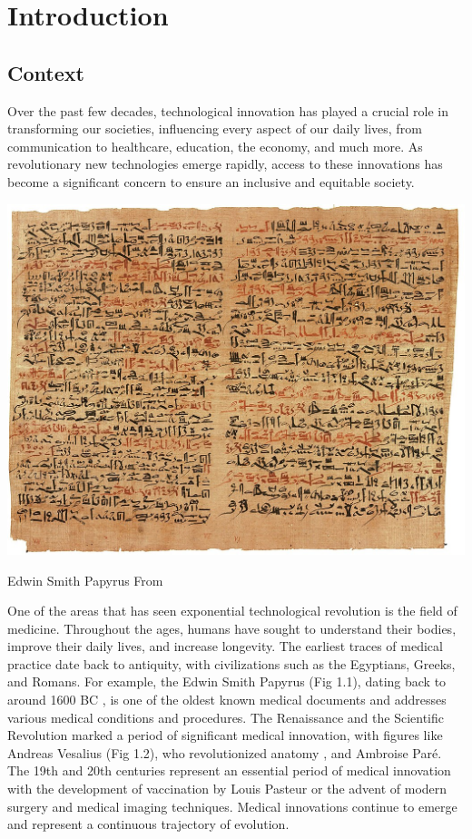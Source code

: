 \chapter{Introduction}
\section{Context}
Over the past few decades, technological innovation has played a crucial role in transforming our societies, influencing every aspect of our daily lives, from communication to healthcare, education, the economy, and much more. As revolutionary new technologies emerge rapidly, access to these innovations has become a significant concern to ensure an inclusive and equitable society.

\begin{marginfigure}[-5.5cm]
	\includegraphics{YOURNAME/images/Edwin_Smith_Papyrus_v2.jpg}
	\caption[]{Edwin Smith Papyrus From \cite{van_middendorp_edwin_2010}}
	\labfig{}
\end{marginfigure} 

One of the areas that has seen exponential technological revolution is the field of medicine. Throughout the ages, humans have sought to understand their bodies, improve their daily lives, and increase longevity. The earliest traces of medical practice date back to antiquity, with civilizations such as the Egyptians, Greeks, and Romans. For example, the Edwin Smith Papyrus (Fig 1.1), dating back to around 1600 BC \cite{van_middendorp_edwin_2010}, is one of the oldest known medical documents and addresses various medical conditions and procedures. The Renaissance and the Scientific Revolution marked a period of significant medical innovation, with figures like Andreas Vesalius (Fig 1.2), who revolutionized anatomy \cite{zampieri_andreas_2015}, and Ambroise Paré. The 19th and 20th centuries represent an essential period of medical innovation with the development of vaccination by Louis Pasteur or the advent of modern surgery and medical imaging techniques. Medical innovations continue to emerge and represent a continuous trajectory of evolution.

